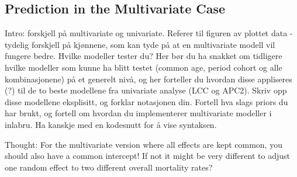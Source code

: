 \newpage
\subsection{Prediction in the Multivariate Case}

\textcolor{myDarkGreen}{
Intro: forskjell på multivariate og univariate. Referer til figuren av plottet data - tydelig forskjell på kjønnene, som kan tyde på at en multivariate modell vil fungere bedre. 
\newline \newline 
Hvilke modeller tester du? Her bør du ha snakket om tidligere hvilke modeller som kunne ha blitt testet (common age, period cohort og alle kombinasjonene) på et generelt nivå, og her forteller du hvordan disse appliseres (?) til de to beste modellene fra univariate analyse (LCC og APC2). Skriv opp disse modellene eksplisitt, og forklar notasjonen din. 
\newline \newline
Fortell hva slags priors du har brukt, og fortell om hvordan du implementerer multivariate modeller i inlabru. Ha kanskje med en kodesnutt for å vise syntaksen. 
}

\textcolor{myDarkGreen}{Thought: For the multivariate version where all effects are kept common, you should also have a common intercept! If not it might be very different to adjust one random effect to two different overall mortality rates?}

